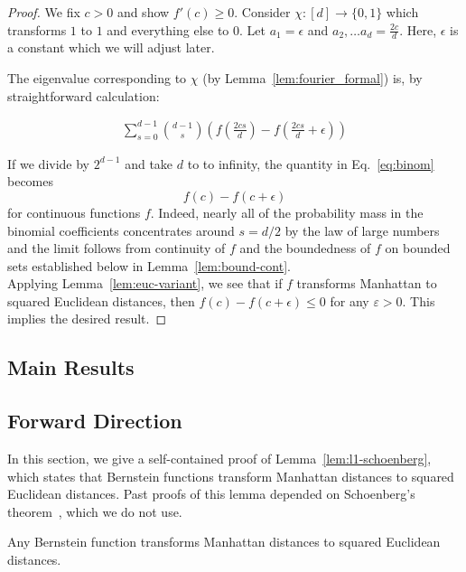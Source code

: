 \begin{proof}
We fix $c>0$ and show $f'(c)\geq 0$. Consider $\chi:[d] \rightarrow
\{0, 1\}$ which transforms $1$ to $1$ and everything else to $0$. Let
$a_1 = \epsilon$ and $a_2, \ldots a_d = \frac{2c}{d}$. Here, $\epsilon$
is a constant which we will adjust later. 

The eigenvalue corresponding to $\chi$ (by Lemma~\ref{lem:fourier_formal}) is, by straightforward calculation:

\begin{align} \label{eq:binom}
\sum_{s = 0}^{d-1} \binom{d-1}{s} \left(f\left(\frac{2cs}{d}\right)-
    f\left(\frac{2cs}{d}+\epsilon\right)\right) 
\end{align} 

If we divide by $2^{d-1}$ and take $d$ to to infinity, the quantity in
Eq.~\eqref{eq:binom} becomes
\[ f(c) - f(c+\epsilon) \]
for continuous functions $f$. Indeed, nearly all of the probability mass in the binomial coefficients concentrates around $s=d/2$ by the law of large numbers and the limit follows from continuity of $f$ and the boundedness of $f$ on bounded sets established below in Lemma~\ref{lem:bound-cont}.\\

Applying Lemma~\ref{lem:euc-variant}, we see that if $f$ transforms Manhattan to squared Euclidean distances, then $f(c)- f(c+\epsilon)\leq 0$ for    any $\varepsilon>0$. This implies the desired result.
\end{proof}


\subsection{Main Results}\label{sec:manhattan_transform12:main}


\iffalse
\subsection{Forward Direction}\label{sec:finite_hyperrectangle}
In this section, we give a self-contained proof of
Lemma~\ref{lem:l1-schoenberg}, which states that Bernstein functions
transform Manhattan distances to squared Euclidean distances. Past proofs of
this lemma depended on Schoenberg's theorem~\cite{s38}, which we do not use.

\begin{lemma} \label{lem:l1-schoenberg} 
Any Bernstein function transforms Manhattan distances to squared Euclidean distances.
\end{lemma}





